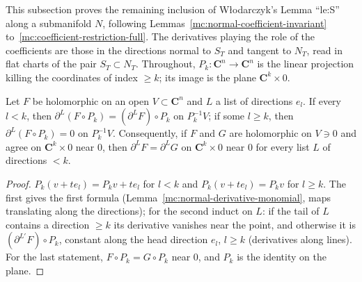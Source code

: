 This subsection proves the remaining inclusion of Włodarczyk's Lemma ``le:S'' along a submanifold \(N\), following Lemmas~\ref{mc:normal-coefficient-invariant}
to~\ref{mc:coefficient-restriction-full}. The derivatives playing the role of the coefficients are those in the directions normal to \(S_T\) and tangent to \(N_T\), read in
flat charts of the pair \(S_T\subset N_T\). Throughout, \(P_k\colon\mathbf C^n\to\mathbf C^n\) is the linear projection killing the coordinates of index \(\ge k\); its image is
the plane \(\mathbf C^k\times0\).

\begin{lemma}
\label{mc:plane-retraction-derivatives}
\leanok
Let \(F\) be holomorphic on an open \(V\subset\mathbf C^n\) and \(L\) a list of directions \(e_l\). If every \(l<k\), then \(\partial^L(F\circ P_k)=(\partial^LF)\circ P_k\)
on \(P_k^{-1}V\); if some \(l\ge k\), then \(\partial^L(F\circ P_k)=0\) on \(P_k^{-1}V\). Consequently, if \(F\) and \(G\) are holomorphic on \(V\ni0\) and agree on
\(\mathbf C^k\times0\) near \(0\), then \(\partial^LF=\partial^LG\) on \(\mathbf C^k\times0\) near \(0\) for every list \(L\) of directions \(<k\).
\end{lemma}
\begin{proof}
\leanok
\(P_k(v+te_l)=P_kv+te_l\) for \(l<k\) and \(P_k(v+te_l)=P_kv\) for \(l\ge k\). The first gives the first formula (Lemma~\ref{mc:normal-derivative-monomial}, maps
translating along the directions); for the second induct on \(L\): if the tail of \(L\) contains a direction \(\ge k\) its derivative vanishes near the point, and
otherwise it is \((\partial^{L'}F)\circ P_k\), constant along the head direction \(e_l\), \(l\ge k\) (derivatives along lines). For the last statement,
\(F\circ P_k=G\circ P_k\) near \(0\), and \(P_k\) is the identity on the plane.
\end{proof}

